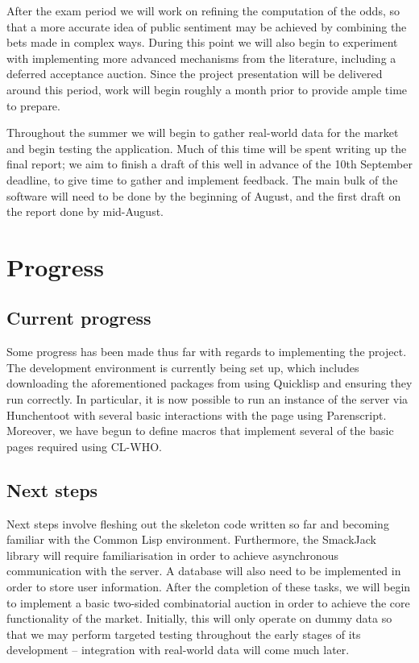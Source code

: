 \documentclass[10pt,a4paper]{article}
\theoremstyle{plain}
\theoremstyle{definition}
\begin{document}
	After the exam period we will work on refining the computation of the odds,
	so that a more accurate idea of public sentiment may be achieved by
	combining the bets made in complex ways. During this point we will also
	begin to experiment with implementing more advanced mechanisms from the
	literature, including a deferred acceptance auction. Since the project
	presentation will be delivered around this period, work will begin roughly
	a month prior to provide ample time to prepare.

	Throughout the summer we will begin to gather real-world data for the
	market and begin testing the application. Much of this time will be spent
	writing up the final report; we aim to finish a draft of this well in
	advance of the 10th September deadline, to give time to gather and
	implement feedback. The main bulk of the software will need to be done by
	the beginning of August, and the first draft on the report done by
	mid-August.

\section{Progress}
	\label{sec:progress}

	\subsection{Current progress}

	Some progress has been made thus far with regards to implementing the
	project. The development environment is currently being set up, which
	includes downloading the aforementioned packages from using Quicklisp and
	ensuring they run correctly. In particular, it is now possible to run an
	instance of the server via Hunchentoot with several basic interactions with
	the page using Parenscript. Moreover, we have begun to define macros that
	implement several of the basic pages required using CL-WHO.

	\subsection{Next steps}

	Next steps involve fleshing out the skeleton code written so far and
	becoming familiar with the Common Lisp environment. Furthermore, the
	SmackJack library will require familiarisation in order to achieve
	asynchronous communication with the server. A database will also need to be
	implemented in order to store user information. After the completion of
	these tasks, we will begin to implement a basic two-sided combinatorial
	auction in order to achieve the core functionality of the market.
	Initially, this will only operate on dummy data so that we may perform
	targeted testing throughout the early stages of its development --
	integration with real-world data will come much later.
\end{document}
